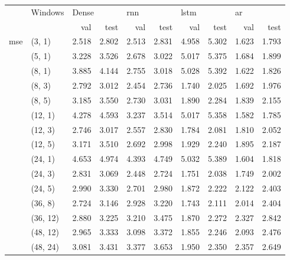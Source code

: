\vspace{2em}

\begin{tabular}{ll|rr|rr|rr|rr}
\toprule
      &   Windows       & \multicolumn{2}{l}{Dense} & \multicolumn{2}{l}{\acrshort{rnn}} & \multicolumn{2}{l}{\acrshort{lstm}} & \multicolumn{2}{l}{\acrshort{ar}} \\*
      &          & val & test & val & test & val & test & val & test \\*
\midrule
\multirow{15}{*}{\acrshort{mse}} & (3, 1) &     2.518 &      2.802 &   2.513 &    2.831 &    4.958 &     5.302 &  1.623 &   1.793 \\*
      & (5, 1) &     3.228 &      3.526 &   2.678 &    3.022 &    5.017 &     5.375 &  1.684 &   1.899 \\*
      & (8, 1) &     3.885 &      4.144 &   2.755 &    3.018 &    5.028 &     5.392 &  1.622 &   1.826 \\*
      & (8, 3) &     2.792 &      3.012 &   2.454 &    2.736 &    1.740 &     2.025 &  1.692 &   1.976 \\*
      & (8, 5) &     3.185 &      3.550 &   2.730 &    3.031 &    1.890 &     2.284 &  1.839 &   2.155 \\*
      & (12, 1) &     4.278 &      4.593 &   3.237 &    3.514 &    5.017 &     5.358 &  1.582 &   1.785 \\*
      & (12, 3) &     2.746 &      3.017 &   2.557 &    2.830 &    1.784 &     2.081 &  1.810 &   2.052 \\*
      & (12, 5) &     3.171 &      3.510 &   2.692 &    2.998 &    1.929 &     2.240 &  1.895 &   2.187 \\*
      & (24, 1) &     4.653 &      4.974 &   4.393 &    4.749 &    5.032 &     5.389 &  1.604 &   1.818 \\*
      & (24, 3) &     2.831 &      3.069 &   2.448 &    2.724 &    1.751 &     2.038 &  1.749 &   2.002 \\*
      & (24, 5) &     2.990 &      3.330 &   2.701 &    2.980 &    1.872 &     2.222 &  2.122 &   2.403 \\*
      & (36, 8) &     2.724 &      3.146 &   2.928 &    3.220 &    1.743 &     2.111 &  2.014 &   2.404 \\*
      & (36, 12) &     2.880 &      3.225 &   3.210 &    3.475 &    1.870 &     2.272 &  2.327 &   2.842 \\*
      & (48, 12) &     2.965 &      3.333 &   3.098 &    3.372 &    1.855 &     2.246 &  2.093 &   2.476 \\*
      & (48, 24) &     3.081 &      3.431 &   3.377 &    3.653 &    1.950 &     2.350 &  2.357 &   2.649 \\*
\bottomrule

\end{tabular}


